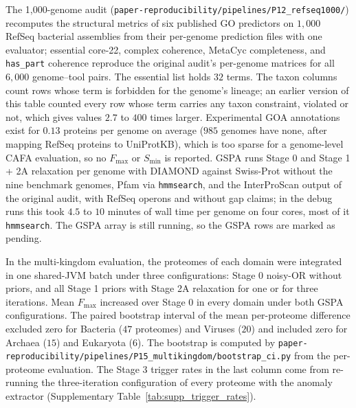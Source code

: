\documentclass[10pt]{article}
\newcommand{\fn}[1]{\nolinkurl{#1}}
\begin{document}
The 1,000-genome audit (\fn{paper-reproducibility/pipelines/P12_refseq1000/}) recomputes the structural metrics of six published GO predictors on $1{,}000$ RefSeq bacterial assemblies from their per-genome prediction files with one evaluator; essential core-22, complex coherence, MetaCyc completeness, and \texttt{has\_part} coherence reproduce the original audit's per-genome matrices for all $6{,}000$ genome--tool pairs. The essential list holds $32$ terms. The taxon columns count rows whose term is forbidden for the genome's lineage; an earlier version of this table counted every row whose term carries any taxon constraint, violated or not, which gives values $2.7$ to $400$ times larger. Experimental GOA annotations exist for $0.13$ proteins per genome on average ($985$ genomes have none, after mapping RefSeq proteins to UniProtKB), which is too sparse for a genome-level CAFA evaluation, so no $F_{\max}$ or $S_{\min}$ is reported. GSPA runs Stage 0 and Stage 1 + 2A relaxation per genome with DIAMOND against Swiss-Prot without the nine benchmark genomes, Pfam via \texttt{hmmsearch}, and the InterProScan output of the original audit, with RefSeq operons and without gap claims; in the debug runs this took $4.5$ to $10$ minutes of wall time per genome on four cores, most of it \texttt{hmmsearch}. The GSPA array is still running, so the GSPA rows are marked as pending.

In the multi-kingdom evaluation, the proteomes of each domain were integrated in one shared-JVM batch under three configurations: Stage 0 noisy-OR without priors, and all Stage 1 priors with Stage 2A relaxation for one or for three iterations. Mean $F_{\max}$ increased over Stage 0 in every domain under both GSPA configurations. The paired bootstrap interval of the mean per-proteome difference excluded zero for Bacteria ($47$ proteomes) and Viruses ($20$) and included zero for Archaea ($15$) and Eukaryota ($6$). The bootstrap is computed by \fn{paper-reproducibility/pipelines/P15_multikingdom/bootstrap_ci.py} from the per-proteome evaluation. The Stage 3 trigger rates in the last column come from re-running the three-iteration configuration of every proteome with the anomaly extractor (Supplementary Table~\ref{tab:supp_trigger_rates}).
\end{document}
